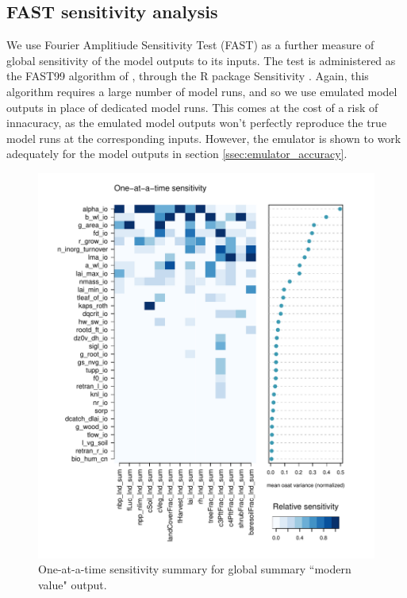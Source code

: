 \documentclass[gmd, manuscript]{copernicus}
\begin{document}
\subsection{FAST sensitivity analysis}

We use Fourier Amplitiude Sensitivity Test (FAST) as a further measure of global sensitivity of the model outputs to its inputs. The test is administered as the FAST99 algorithm of \cite{Saltelli1999}, through the R package Sensitivity \citep{Rsensitivity}. Again, this algorithm requires a large number of model runs, and so we use emulated model outputs in place of dedicated model runs. This comes at the cost of a risk of innacuracy, as the emulated model outputs won't perfectly reproduce the true model runs at the corresponding inputs. However, the emulator is shown to work adequately for the model outputs in section \ref{ssec:emulator_accuracy}. 



\begin{figure}[t]
\includegraphics[width=12cm]{./graphics/oat_var_sensmat_level1a_Y}
\caption{One-at-a-time sensitivity summary for global summary ``modern value" output.}
\label{fig:oat_var_sensmat_level1a_Y}
\end{figure}
\end{document}
